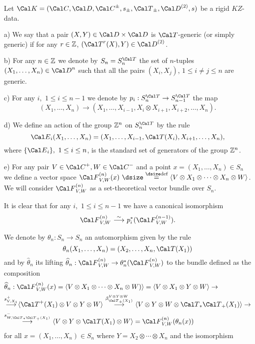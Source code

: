   Let ${\Cal K} = ({\Cal C}, {\Cal D}, {\Cal
C}^\pm,
s_\pm, {\Cal T}_\pm, {\Cal D}^{(2)},s)$  be a rigid  $KZ$-data.

\item{a)}  We say that a pair $(X,Y) \in
{\Cal D} \times {\Cal D}$  is ${\Cal T}$-generic
(or simply generic) if for any
$r \in {\Bbb Z}$, $({\Cal T}^r(X),Y) \in {\Cal D}^{(2)}$.

\item{b)}  For any $n \in {\Bbb Z}$  we denote by  $S_n = S^{\Cal T}_n$  the
set of
$n$-tuples $(X_1,\ldots,X_n) \in {\Cal D}^n$  such that all the pairs
$(X_i,X_j)$, $1 \le i \ne j \le n$  are generic.

\item{c)}  For any $i$,\ $1 \le i \le n-1$  we denote by  $p_i: S^{\Cal T}_n
\to
S^{\Cal T}_{n-1}$  the map
$$
(X_1,\ldots,X_n) \to (X_1,\ldots,X_{i-1}, X_i \otimes X_{i+1},
X_{i+2},\ldots,X_n).
$$

\item{d)} We define an action of the group  ${\Bbb Z}^n$  on $S^{\Cal T}_n$  by
the rule
$$
{\Cal E}_i(X_1,\ldots,X_n) = (X_1,\ldots,X_{i-1}, {\Cal T}(X_i),
X_{i+1},\ldots,X_n),
$$
where   $\{ {\Cal E}_i\},\ 1 \le i \le n$,  is the standard
set of generators of the group  ${\Bbb Z}^n$.

\item{e)}  For any  pair  $V \in {\Cal C}^+, W \in {\Cal C}^-$  and a point
$x = (X_1,\ldots,X_n) \in S_n$  we define a vector space
${\Cal F}^{(n)}_{V,W}(x)\ {\dsize\buildrel {\dsize\text{def}}\over =}\
\langle V \otimes X_1 \otimes \cdots \otimes X_n \otimes W\rangle$.  We will
consider  ${\Cal F}^{(n)}_{V,W}$  as a set-theoretical vector bundle over
$S_n$.
\endproclaim

It is clear that for any  $i$,\ $1 \le i \le n-1$  we have a
canonical isomorphism
$$
{\Cal F}^{(n)}_{V,W}\ {\buildrel \sim\over\longrightarrow}\
p^*_i({\Cal F}^{(n-1)}_{V,W}).
$$
\enddemo

  We denote by  $\theta_n: S_n \to S_n$  an
automorphism
given by the rule
$$
\theta_n(X_1,\ldots,X_n) = (X_2,\ldots,X_n, {\Cal T}(X_1))
$$
and by   $\widehat{\theta}_n$  its lifting  $\widehat{\theta}_n:
{\Cal F}^{(n)}_{V,W} \to \theta^*_n({\Cal F}^{(n)}_{V,W})$  to the bundle
defined as the composition
$$
\aligned
& \widehat{\theta}_n: {\Cal F}^{(n)}_{V,W}(x) = \langle V \otimes X_1 \otimes
\cdots \otimes X_n \otimes W)\rangle = \langle V \otimes X_1 \otimes Y \otimes
W\rangle \to \\
&{\buildrel {s^+_{V,X_1}}\over\longrightarrow} \langle {\Cal T}^+(X_1) \otimes
V
\otimes Y \otimes W\rangle\
{\buildrel{\beta_{{\Cal T}_+(X_1)}^{V\otimes Y \otimes
W}}\over\longrightarrow}\
\langle V \otimes Y \otimes W \otimes {\Cal T}_* {\Cal T}_+ (X_1) \rangle \to
\\
& {\buildrel {s^-_{W,{\Cal T}_*{\Cal T}_+(X_1)}}\over\longrightarrow}\ \langle
V
\otimes Y \otimes {\Cal T}(X_1) \otimes W\rangle =
{\Cal F}^{(n)}_{V,W}(\theta_n(x))
\endaligned
$$
for all $x = (X_1,\ldots,X_n) \in S_n$  where  $Y = X_2 \otimes \cdots \otimes
X_n$  and the isomorphism

